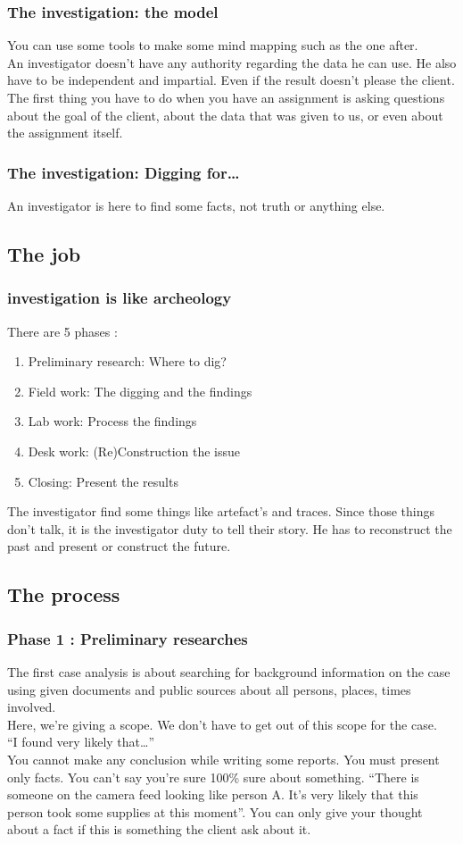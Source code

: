 \subsubsection{The investigation: the model}
You can use some tools to make some mind mapping such as the one after.\\
An investigator doesn't have any authority regarding the data he can use. He also have to be independent and impartial. Even if the result doesn't please the client.\\
The first thing you have to do when you have an assignment is asking questions about the goal of the client, about the data that was given to us, or even about the assignment itself.
\subsubsection{The investigation: Digging for\ldots}
An investigator is here to find some facts, not truth or anything else.\\
\subsection{The job}
\subsubsection{investigation is like archeology}
There are 5 phases :
\begin{enumerate}
 \item Preliminary research: Where to dig?
 \item Field work: The digging and the findings
 \item Lab work: Process the findings
 \item Desk work: (Re)Construction the issue
 \item Closing: Present the results
\end{enumerate}
The investigator find some things like artefact's and traces. Since those things don't talk, it is the investigator duty to tell their story. He has to reconstruct the past and present or construct the future.
\subsection{The process}
\subsubsection{Phase 1 : Preliminary researches}
The first case analysis is about searching for background information on the case using given documents and public sources about all persons, places, times involved.\\
Here, we're giving a scope. We don't have to get out of this scope for the case.\\
\enquote{I found very likely that\ldots}\\
You cannot make any conclusion while writing some reports. You must present only facts. You can't say you're sure 100\% sure about something. \enquote{There is someone on the camera feed looking like person A. It's very likely that this person took some supplies at this moment}. You can only give your thought about a fact if this is something the client ask about it.